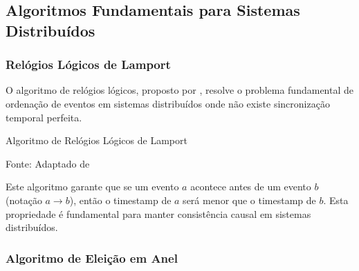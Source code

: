 \subsection{Algoritmos Fundamentais para Sistemas Distribuídos}

\subsubsection{Relógios Lógicos de Lamport}

O algoritmo de relógios lógicos, proposto por , resolve o problema fundamental de ordenação de eventos em sistemas distribuídos onde não existe sincronização temporal perfeita.

\begin{algorithm}[H]
\SetAlgoLined
{}


\caption{Algoritmo de Relógios Lógicos de Lamport}

\label{alg:lamport_clocks}
{\fontsize{10pt}{\baselineskip}\selectfont
Fonte: Adaptado de }
\end{algorithm}

Este algoritmo garante que se um evento $a$ acontece antes de um evento $b$ (notação $a \rightarrow b$), então o timestamp de $a$ será menor que o timestamp de $b$. Esta propriedade é fundamental para manter consistência causal em sistemas distribuídos.

\subsubsection{Algoritmo de Eleição em Anel}


